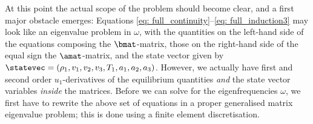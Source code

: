 At this point the actual scope of the problem should become clear, and a first major obstacle emerges: Equations \eqref{eq: full_continuity}--\eqref{eq: full_induction3} may look like an eigenvalue problem in $\omega$, with the quantities on the left-hand side of the equations composing the $\bmat$-matrix, those on the right-hand side of the equal sign the $\amat$-matrix, and the state vector given by $\statevec = (\rho_1, v_1, v_2, v_3, T_1, a_1, a_2, a_3)$. However, we actually have first and second order $u_1$-derivatives of the equilibrium quantities \emph{and} the state vector variables \emph{inside} the matrices.
Before we can solve for the eigenfrequencies $\omega$, we first have to rewrite the above set of equations in a proper generalised matrix eigenvalue problem; this is done using a finite element discretisation.


